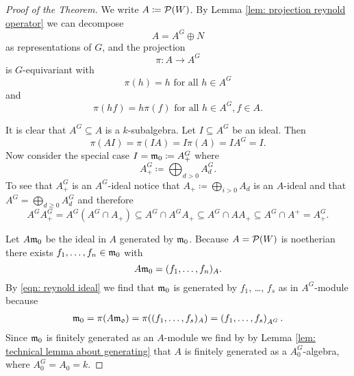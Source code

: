 \begin{proof}[Proof of the Theorem]
  We write $A \coloneqq \mathcal{P}(W)$. By Lemma \ref{lem: projection reynold operator} we can decompose
  \[
    A = A^G \oplus N
  \]
  as representations of $G$, and the projection
  \[
    \pi \colon A \to A^G
  \]
  is $G$-equivariant with
  \[
    \pi(h) = h \text{ for all } h \in A^G
  \]
  and
  \[
    \pi(hf) = h\pi(f) \text{ for all } h \in A^G, f \in A.
  \]
  
  It is clear that $A^G \subseteq A$ is a $k$-subalgebra. Let $I \subseteq A^G$ be an ideal. Then
  \begin{equation}\label{eqn: reynold ideal}
    \pi(A I) = \pi(I A) = I \pi(A) = I A^G = I.
  \end{equation}
  Now consider the special case $I = \mathfrak{m}_0 \coloneqq A^G_+$ where
  \[
    A^G_+ \coloneqq \bigoplus_{d > 0} A^G_d.
  \]
  To see that $A^G_+$ is an $A^G$-ideal notice that $A_+ \coloneqq \bigoplus_{i > 0} A_d$ is an $A$-ideal and that $A^G = \bigoplus_{d \geq 0} A^G_d$ and therefore
  \[
    A^G A^G_+
    = A^G \left(A^G \cap A_+\right)
    \subseteq A^G \cap A^G A_+
    \subseteq A^G \cap A A_+
    \subseteq A^G \cap A^+
    = A^G_+.
  \]
  
  Let $A \mathfrak{m}_0$ be the ideal in $A$ generated by $\mathfrak{m}_0$. Because $A = \mathcal{P}(W)$ is noetherian there exists $f_1, \dotsc, f_n \in \mathfrak{m}_0$ with
  \[
    A \mathfrak{m}_0 = (f_1, \dotsc, f_n)_A.
  \]
  By \eqref{eqn: reynold ideal} we find that $\mathfrak{m}_0$ is generated by $f_1$, \dots, $f_s$ as in $A^G$-module because
  \begin{align*}
    \mathfrak{m}_0
    = \pi(A \mathfrak{m_0})
    = \pi((f_1, \dotsc, f_s)_A)
    = \left( f_1, \dotsc, f_s \right)_{A^G}.
  \end{align*}
  Since $\mathfrak{m}_0$ is finitely generated as an $A$-module we find by by Lemma \ref{lem: technical lemma about generating} that $A$ is finitely generated as a $A_0^G$-algebra, where $A_0^G = A_0 = k$.
\end{proof}





